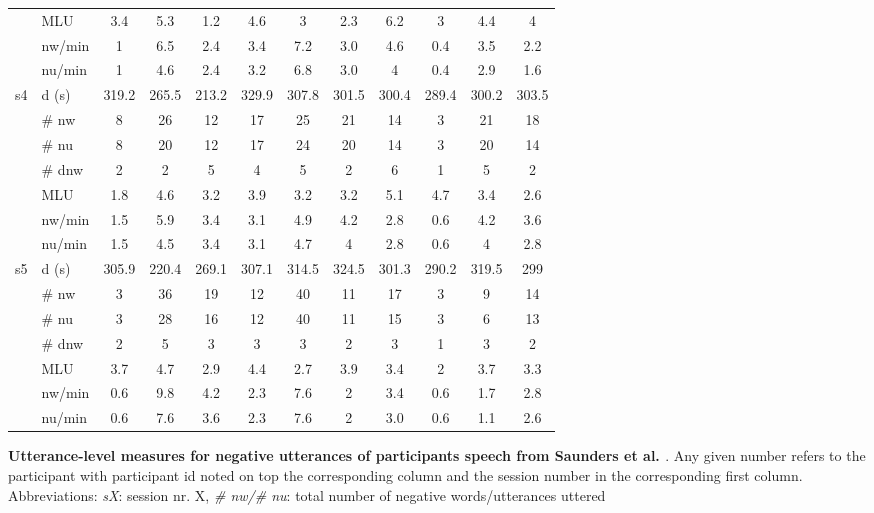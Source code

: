 \begin{screenonly}
\begin{table*}[h]
\begin{tabular*}{\hsize}{@{\extracolsep{\fill}}clcccccccccc}
    & MLU & 3.4 & 5.3 & 1.2 & 4.6 & 3 & 2.3 & 6.2 & 3 & 4.4 & 4\\
    & nw/min & 1 & 6.5 & 2.4 & 3.4 & 7.2 & 3.0 & 4.6 & 0.4 & 3.5 & 2.2\\
    & nu/min & 1 & 4.6 & 2.4 & 3.2 & 6.8 & 3.0 & 4 & 0.4 & 2.9 & 1.6\\
    \cmidrule{2-12}
    \multirow{7}{*}{s4} & d (s) & 319.2 & 265.5 & 213.2 & 329.9 & 307.8 & 301.5 & 300.4 & 289.4 & 300.2 & 303.5\\
    & \# nw & 8 & 26 & 12 & 17 & 25 & 21 & 14 & 3 & 21 & 18\\
    & \# nu & 8 & 20 & 12 & 17 & 24 & 20 & 14 & 3 & 20 & 14\\
    & \# dnw & 2 & 2 & 5 & 4 & 5 & 2 & 6 & 1 & 5 & 2\\
    & MLU & 1.8 & 4.6 & 3.2 & 3.9 & 3.2 & 3.2 & 5.1 & 4.7 & 3.4 & 2.6\\
    & nw/min & 1.5 & 5.9 & 3.4 & 3.1 & 4.9 & 4.2 & 2.8 & 0.6 & 4.2 & 3.6\\
    & nu/min & 1.5 & 4.5 & 3.4 & 3.1 & 4.7 & 4 & 2.8 & 0.6 & 4 & 2.8\\
    \cmidrule{2-12}
    \multirow{7}{*}{s5} & d (s) & 305.9 & 220.4 & 269.1 & 307.1 & 314.5 & 324.5 & 301.3 & 290.2 & 319.5 & 299\\
    & \# nw & 3 & 36 & 19 & 12 & 40 & 11 & 17 & 3 & 9 & 14\\
    & \# nu & 3 & 28 & 16 & 12 & 40 & 11 & 15 & 3 & 6 & 13\\
    & \# dnw & 2 & 5 & 3 & 3 & 3 & 2 & 3 & 1 & 3 & 2\\
    & MLU & 3.7 & 4.7 & 2.9 & 4.4 & 2.7 & 3.9 & 3.4 & 2 & 3.7 & 3.3\\
    & nw/min & 0.6 & 9.8 & 4.2 & 2.3 & 7.6 & 2 & 3.4 & 0.6 & 1.7 & 2.8\\
    & nu/min & 0.6 & 7.6 & 3.6 & 2.3 & 7.6 & 2 & 3.0 & 0.6 & 1.1 & 2.6\\
    \bottomrule
  \end{tabular*}
\end{table*}
\begin{table*}[h]
  \begin{center}
    \caption{\textbf{Utterance-level measures for negative utterances of participants speech from Saunders et al. \cite{Saunders2012}}.
      Any given number refers to the participant with participant id noted on top the corresponding column and the session number in the
      corresponding first column. Abbreviations: \textsl{sX}: session nr. X, \textsl{\# nw/\# nu}: total number of negative words/utterances uttered
}
\end{center}
\end{table*}
\end{screenonly}
